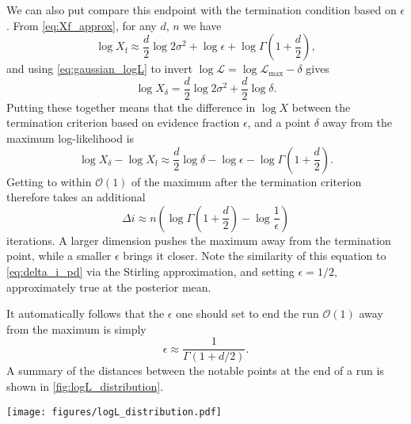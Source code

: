 \documentclass[usenatbib]{mnras}
\newcommand{\Like}{\mathcal{L}}
\newcommand{\logLmax}{\log \Like_\mathrm{max}}
\begin{document}
\par
We can also put compare this endpoint with the termination condition based on $\epsilon$. From \cref{eq:Xf_approx}, for any $d$, $n$ we have
\begin{equation}
    \log X_\mathrm{f} \approx \frac{d}{2}\log 2\sigma^2 + \log\epsilon + \log\Gamma\left(1+\frac{d}{2}\right),
\end{equation}
and using \cref{eq:gaussian_logL} to invert $\log\Like = \logLmax-\delta$ gives
\begin{equation}
    \log X_\delta=\frac{d}{2}\log 2\sigma^2+\frac{d}{2}\log\delta.
\end{equation}
Putting these together means that the difference in $\log X$ between the termination criterion based on evidence fraction $\epsilon$, and a point $\delta$ away from the maximum log-likelihood is
\begin{equation}
    \log X_\delta - \log X_\mathrm{f} \approx \frac{d}{2}\log\delta - \log\epsilon - \log\Gamma\left(1+\frac{d}{2}\right).
\end{equation}
Getting to within $\mathcal{O}(1)$ of the maximum after the termination criterion therefore takes an additional
 \begin{equation}
     \Delta i \approx n \left(\log\Gamma\left(1+\frac{d}{2}\right) - \log\frac{1}{\epsilon}\right)
\end{equation}
iterations. A larger dimension pushes the maximum away from the termination point, while a smaller $\epsilon$ brings it closer. Note the similarity of this equation to \cref{eq:delta_i_pd} via the Stirling approximation, and setting $\epsilon = 1/2$, approximately true at the posterior mean. 
\par
It automatically follows that the $\epsilon$ one should set to end the run $\mathcal{O}(1)$ away from the maximum is simply
\begin{equation}
    \boxed{\epsilon \approx \frac{1}{\Gamma\left(1 + d/2\right)}}.
\end{equation}
A summary of the distances between the notable points at the end of a run is shown in \cref{fig:logL_distribution}.

\begin{figure*}
\begin{center}
    \texttt{[image: figures/logL\_distribution.pdf]}
\end{center}
\caption{Distribution of samples as a function of $\log\mathcal{L}$, showing the posterior $\mathcal{P}(\log\mathcal{L})$, the distribution of the live points $\mathcal{\pi}(\log\mathcal{L} \mid \mathcal{L}>\mathcal{L}_i)$, and the distribution of the maximum likelihood live point $P(\log\mathcal{L}_\mathrm{max}^\mathrm{live})$. The distances are shown between these locations at the end of the run, the key takeaway being that in high dimensions the highest log-likelihood point of a nested sampling run is nowhere near the maximum in high dimensions.}
\label{fig:logL_distribution}
\end{figure*}
\end{document}
